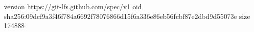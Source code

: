 version https://git-lfs.github.com/spec/v1
oid sha256:09dcf9a3f46f784a6692f78076866d15f6a336e86eb56fcbf87e2dbd9d55073e
size 174888
